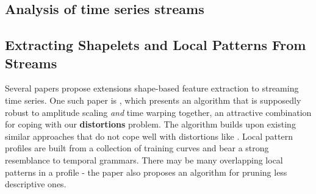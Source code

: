 %

	\subsection{Analysis of time series streams}
	\label{sec:timeseriesstreams}
	
	\subsection{Extracting Shapelets and Local Patterns From Streams}
	Several papers propose extensions shape-based feature extraction to streaming time series. One such paper is \citep{chen2007spade}, which presents an algorithm that is supposedly robust to amplitude scaling \emph{and} time warping together, an attractive combination for coping with our \textbf{distortions} problem. The algorithm builds upon existing similar approaches that do not cope well with distortions like \citep{wu2004online}. Local pattern profiles are built from a collection of training curves and bear a strong resemblance to temporal grammars. There may be many overlapping local patterns in a profile - the paper also proposes an algorithm for pruning less descriptive ones.
